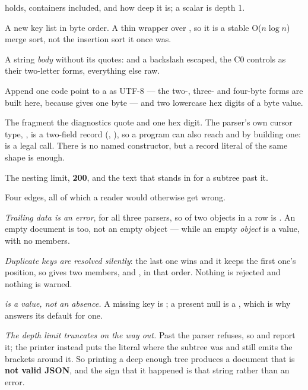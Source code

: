\begin{description}[style=nextline,leftmargin=5.2em]
  holds, containers included, and how deep it is; a scalar is depth 1.
\item[\ic{json.sort\_keys(ks)}] A new key list in byte order. A thin wrapper
  over , so it is a stable O($n \log n$) merge sort, not
  the insertion sort it once was.
\item[\ic{json.escape(s)}] A string \emph{body} without its quotes:  and a
  backslash escaped, the C0 controls as their two-letter forms, everything else
  raw.
\item[\ic{json.utf8\_put(b, cp)}, \ic{json.hex2(c)}] Append one code point to a
  \ic{[byte]} as UTF-8 --- the two-, three- and four-byte forms are built here,
  because  gives one byte --- and two lowercase hex digits of a byte
  value.
\item[\ic{json.p\_show(s, i)}, \ic{json.hexval(c)}] The fragment the
  diagnostics quote and one hex digit. The parser's own cursor type,
  , is a two-field record (, ), so a program can also
  reach  and  by building one:
   is a legal call. There is no named
   constructor, but a record literal of the same shape is enough.
\item[\ic{json.json\_depth\_max}, \ic{json.json\_depth\_error}] The nesting
  limit, \textbf{200}, and the text that stands in for a subtree past it.
\end{description}

Four edges, all of which a reader would otherwise get wrong.

\emph{Trailing data is an error}, for all three parsers, so  of two
objects in a row is . An empty document is  too, not an empty
object --- while an empty \emph{object} is a value, with no members.

\emph{Duplicate keys are resolved silently}: the last one wins and it keeps the
first one's position, so  gives two members,
 and , in that order. Nothing is rejected and nothing is warned.

\emph{ is a value, not an absence.} A missing key is ; a
present null is a , which is why  answers its
default for one.

\emph{The depth limit truncates on the way out.} Past  the
parser refuses, so  and  report it; the printer instead
puts the literal  where the subtree was and still emits the
brackets around it. So printing a deep enough tree produces a document that is
\textbf{not valid JSON}, and the sign that it happened is that string rather
than an error.

